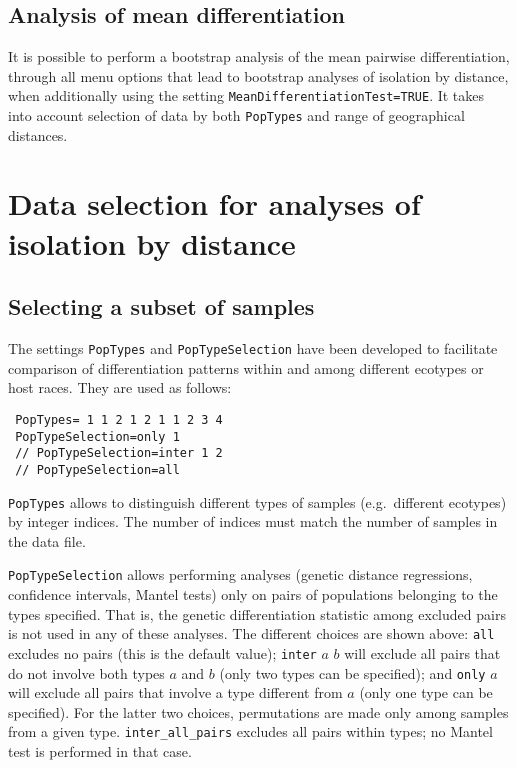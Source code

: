 \documentclass[12pt,]{book}
\theoremstyle{definition}
\theoremstyle{definition}
\theoremstyle{definition}
\theoremstyle{remark}
\begin{document}
\subsection{Analysis of mean
differentiation}\label{analysis-of-mean-differentiation}

 It is possible to perform a
bootstrap analysis of the mean pairwise differentiation, through all
menu options that lead to bootstrap analyses of isolation by distance,
when additionally using the setting
\texttt{MeanDifferentiationTest=TRUE}. It takes into account selection
of data by both \texttt{PopTypes} and range of geographical distances.

\section{Data selection for analyses of isolation by
distance}\label{data-selection-for-analyses-of-isolation-by-distance}

\subsection{Selecting a subset of
samples}\label{selecting-a-subset-of-samples}

  The settings
\texttt{PopTypes} and \texttt{PopTypeSelection} have been developed to
facilitate comparison of differentiation patterns within and among
different ecotypes or host races. They
are used as follows:

\begin{verbatim}
 PopTypes= 1 1 2 1 2 1 1 2 3 4
 PopTypeSelection=only 1
 // PopTypeSelection=inter 1 2
 // PopTypeSelection=all
\end{verbatim}

\texttt{PopTypes} allows to distinguish different types of samples
(e.g.~different ecotypes) by integer indices. The number of indices must
match the number of samples in the data file.

\texttt{PopTypeSelection} allows performing analyses (genetic distance
regressions, confidence intervals, Mantel tests) only on pairs of
populations belonging to the types specified. That is, the genetic
differentiation statistic among excluded pairs is not used in any of
these analyses. The different choices are shown above: \texttt{all}
excludes no pairs (this is the default value); \texttt{inter} \(a\)
\(b\) will exclude all pairs that do not involve both types \(a\) and
\(b\) (only two types can be specified); and \texttt{only} \(a\) will
exclude all pairs that involve a type different from \(a\) (only one
type can be specified). For the latter two choices, permutations are
made only among samples from a given type. \texttt{inter\_all\_pairs}
excludes all pairs within types; no Mantel test is performed in that
case.
\end{document}
